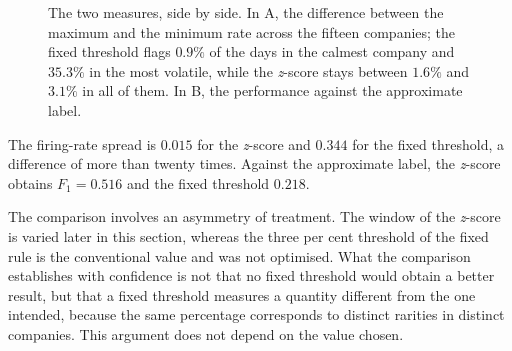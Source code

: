 \begin{figure}[htbp]
\centering
{}
\caption[The two measures of the first question]{The two measures, side by side. In A, the
difference between the maximum and the minimum rate across the fifteen companies; the fixed
threshold flags $0.9\%$ of the days in the calmest company and $35.3\%$ in the most volatile, while
the \emph{z}-score stays between $1.6\%$ and $3.1\%$ in all of them. In B, the performance against
the approximate label.}
\label{fig:av_amplitude}
\end{figure}

The firing-rate spread is $0.015$ for the \emph{z}-score and $0.344$ for the fixed threshold, a
difference of more than twenty times. Against the approximate label, the \emph{z}-score obtains
$F_1 = 0.516$ and the fixed threshold $0.218$.

The comparison involves an asymmetry of treatment. The window of the \emph{z}-score is varied
later in this section, whereas the three per cent threshold of the fixed rule is the conventional
value and was not optimised. What the comparison establishes with confidence is not that no fixed
threshold would obtain a better result, but that a fixed threshold measures a quantity different
from the one intended, because the same percentage corresponds to distinct rarities in distinct
companies. This argument does not depend on the value chosen.

